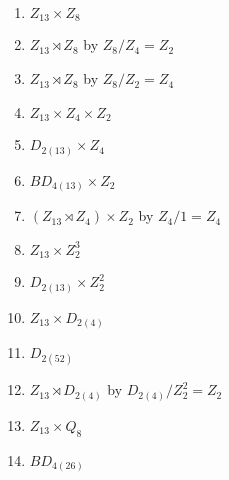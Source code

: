 \documentclass[12pt]{article}
\theoremstyle{definition}
\newcommand{\<}{\langle}
\renewcommand{\>}{\rangle}
\begin{document}
\begin{enumerate}
    \item $Z_{13} \times Z_8$
    \item $Z_{13} \rtimes Z_8$ by $Z_8/Z_4 = Z_2$
    \item $Z_{13} \rtimes Z_8$ by $Z_8/Z_2 = Z_4$
    \\
    \item $Z_{13} \times Z_4 \times Z_2$
    \item $D_{2(13)} \times Z_4$
    \item $BD_{4(13)} \times Z_2$
    \item $(Z_{13} \rtimes Z_4) \times Z_2$ by $Z_4/1 = Z_4$
    \\
    \item $Z_{13} \times Z_2^3$
    \item $D_{2(13)} \times Z_2^2$
    \\
    \item $Z_{13} \times D_{2(4)}$
    \item $D_{2(52)}$
    \item $Z_{13} \rtimes D_{2(4)}$ by $D_{2(4)}/Z_2^2 = Z_2$
    \\
    \item $Z_{13} \times Q_8$
    \item $BD_{4(26)}$
\end{enumerate}


\newpage
\end{document}
